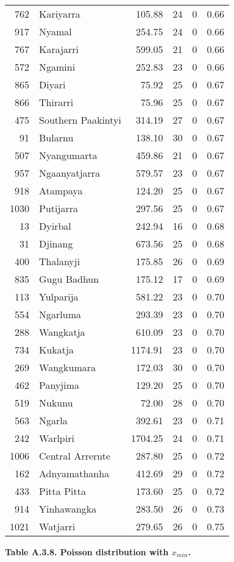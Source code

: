 \begin{longtable}[]{@{}rlrrrr@{}}
762 & Kariyarra & 105.88 & 24 & 0 & 0.66\tabularnewline
917 & Nyamal & 254.75 & 24 & 0 & 0.66\tabularnewline
767 & Karajarri & 599.05 & 21 & 0 & 0.66\tabularnewline
572 & Ngamini & 252.83 & 23 & 0 & 0.66\tabularnewline
865 & Diyari & 75.92 & 25 & 0 & 0.67\tabularnewline
866 & Thirarri & 75.96 & 25 & 0 & 0.67\tabularnewline
475 & Southern Paakintyi & 314.19 & 27 & 0 & 0.67\tabularnewline
91 & Bularnu & 138.10 & 30 & 0 & 0.67\tabularnewline
507 & Nyangumarta & 459.86 & 21 & 0 & 0.67\tabularnewline
957 & Ngaanyatjarra & 579.57 & 23 & 0 & 0.67\tabularnewline
918 & Atampaya & 124.20 & 25 & 0 & 0.67\tabularnewline
1030 & Putijarra & 297.56 & 25 & 0 & 0.67\tabularnewline
13 & Dyirbal & 242.94 & 16 & 0 & 0.68\tabularnewline
31 & Djinang & 673.56 & 25 & 0 & 0.68\tabularnewline
400 & Thalanyji & 175.85 & 26 & 0 & 0.69\tabularnewline
835 & Gugu Badhun & 175.12 & 17 & 0 & 0.69\tabularnewline
113 & Yulparija & 581.22 & 23 & 0 & 0.70\tabularnewline
554 & Ngarluma & 293.39 & 23 & 0 & 0.70\tabularnewline
288 & Wangkatja & 610.09 & 23 & 0 & 0.70\tabularnewline
734 & Kukatja & 1174.91 & 23 & 0 & 0.70\tabularnewline
269 & Wangkumara & 172.03 & 30 & 0 & 0.70\tabularnewline
462 & Panyjima & 129.20 & 25 & 0 & 0.70\tabularnewline
519 & Nukunu & 72.00 & 28 & 0 & 0.70\tabularnewline
563 & Ngarla & 392.61 & 23 & 0 & 0.71\tabularnewline
242 & Warlpiri & 1704.25 & 24 & 0 & 0.71\tabularnewline
1006 & Central Arrernte & 287.80 & 25 & 0 & 0.72\tabularnewline
162 & Adnyamathanha & 412.69 & 29 & 0 & 0.72\tabularnewline
433 & Pitta Pitta & 173.60 & 25 & 0 & 0.72\tabularnewline
914 & Yinhawangka & 283.50 & 26 & 0 & 0.73\tabularnewline
1021 & Watjarri & 279.65 & 26 & 0 & 0.75\tabularnewline
\bottomrule
\end{longtable}

\newpage

\textbf{Table A.3.8. Poisson distribution with \(x_{min}\).}


